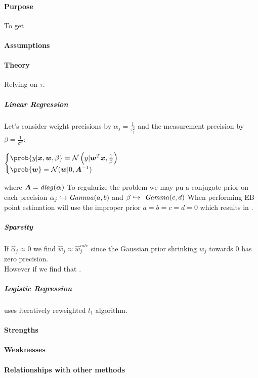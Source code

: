 \paragraph{Purpose}
To get  
\paragraph{Assumptions}
\paragraph{Theory} 
Relying on  $\tau$.
\subparagraph{Linear Regression}
Let's consider weight precisions by $\alpha_{j}=\frac{1}{\tau_{j}^{2}}$ and the 
measurement precision by $\beta=\frac{1}{\sigma^{2}}$:
\begin{center}
    $\begin{cases}
        \prob{y|\bm{x},\bm{w},\beta} = \mathcal{N}\left(y|\bm{w}^{T}\bm{x},\frac{1}{
            \beta}\right) \\
            \prob{\bm{w}} = \mathcal{N}(\bm{w}|0,\bm{A}^{-1})
    \end{cases}$
\end{center}
where $\bm{A}=\text{\emph{diag}}(\bm{\alpha})$
To regularize the problem we may pu a conjugate prior on each precision $\alpha_{j}
\hookrightarrow \text{\emph{Gamma}}(a, b)$ and $\beta \hookrightarrow \text{\emph{
Gamma}}(c, d)$
When performing EB point estimation will use the improper prior $a=b=c=d=0$ which
results in .
\subparagraph{Sparsity}
If $\hat{\alpha}_{j} \approx 0$ we find $\hat{w}_{j}\approx \hat{w}^{mle}_{j}$ since
the Gaussian prior shrinking $w_{j}$ towards 0 has zero precision.\\
However if we find that .
\subparagraph{Logistic Regression}
uses iteratively reweighted $l_{1}$ algorithm.

\paragraph{Strengths}
\paragraph{Weaknesses}
\paragraph{Relationships with other methods}
